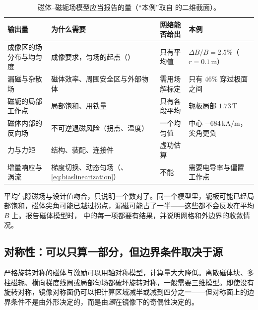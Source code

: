 \begin{table}[htbp]\centering\small
\caption{磁体--磁轭场模型应当报告的量（“本例”取自 的二维截面）。}\label{tab:magnets-outputs}
\begin{tabularx}{\linewidth}{@{}>{\raggedright\arraybackslash}p{.2\linewidth} Y >{\raggedright\arraybackslash}p{.17\linewidth} >{\raggedright\arraybackslash}p{.24\linewidth}@{}}
\toprule
输出量 & 为什么需要 & 网络能否给出 & 本例\\\midrule
成像区的场分布与均匀度 & 成像要求，匀场的起点（） & 只有平均值 & $\Delta B/B=2.5\%$（$r=0.1\,\mathrm m$）\\
漏磁与杂散场 & 磁体效率、周围安全区与外部物体 & 需用场解标定 & 只有 46\% 穿过极面之间\\
磁轭的局部工作点 & 局部饱和、用铁量 & 只有各段平均 & 轭板局部 $1.73\,\mathrm T$\\
磁体内部的反向场 & 不可逆退磁风险（拐点、温度） & 一个均匀值 & 中心 $-684\,\mathrm{kA/m}$，尖角更负\\
力与力矩 & 结构、装配、连接件 & 虚功估算 & \\
增量响应与涡流 & 梯度切换、动态匀场（、\eqref{eq:biaslinearization}） & 不能 & 需要电导率与偏置工作点\\
\bottomrule
\end{tabularx}
\end{table}

\begin{pitfall}
平均气隙磁场与设计值吻合，只说明一个数对了。同一个模型里，轭板可能已经局部饱和，磁体尖角可能已越过拐点，漏磁可能占了一半——这些都不会反映在平均 $B$ 上。报告磁体模型时， 中的每一项都要有结果，并说明网格和外边界的收敛情况。
\end{pitfall}

\subsection{对称性：可以只算一部分，但边界条件取决于源}
严格旋转对称的磁体与激励可以用轴对称模型，计算量大大降低。离散磁体块、多柱磁轭、横向梯度线圈或局部匀场都破坏旋转对称，一般需要三维模型。即使没有旋转对称，镜像对称面仍可以把计算区域减半或减到四分之一——但对称面上的边界条件不是由外形决定的，而是由\emph{源}在镜像下的奇偶性决定的。



